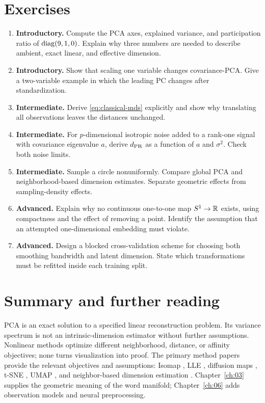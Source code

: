 \section{Exercises}
\begin{enumerate}
\item \textbf{Introductory.} Compute the PCA axes, explained variance, and participation ratio of $\operatorname{diag}(9,1,0)$. Explain why three numbers are needed to describe ambient, exact linear, and effective dimension.
\item \textbf{Introductory.} Show that scaling one variable changes covariance-PCA. Give a two-variable example in which the leading PC changes after standardization.
\item \textbf{Intermediate.} Derive \eqref{eq:classical-mds} explicitly and show why translating all observations leaves the distances unchanged.
\item \textbf{Intermediate.} For $p$-dimensional isotropic noise added to a rank-one signal with covariance eigenvalue $a$, derive $d_{\rm PR}$ as a function of $a$ and $\sigma^2$. Check both noise limits.
\item \textbf{Intermediate.} Sample a circle nonuniformly. Compare global PCA and neighborhood-based dimension estimates. Separate geometric effects from sampling-density effects.
\item \textbf{Advanced.} Explain why no continuous one-to-one map $S^1\to\mathbb{R}$ exists, using compactness and the effect of removing a point. Identify the assumption that an attempted one-dimensional embedding must violate.
\item \textbf{Advanced.} Design a blocked cross-validation scheme for choosing both smoothing bandwidth and latent dimension. State which transformations must be refitted inside each training split.
\end{enumerate}

\section{Summary and further reading}
PCA is an exact solution to a specified linear reconstruction problem. Its variance spectrum is not an intrinsic-dimension estimator without further assumptions. Nonlinear methods optimize different neighborhood, distance, or affinity objectives; none turns visualization into proof. The primary method papers provide the relevant objectives and assumptions: Isomap \citep{tenenbaum2000}, LLE \citep{roweis2000}, diffusion maps \citep{coifman2006}, t-SNE \citep{vandermaaten2008}, UMAP \citep{mcinnes2018}, and neighbor-based dimension estimation \citep{levina2004}. Chapter~\ref{ch:03} supplies the geometric meaning of the word manifold; Chapter~\ref{ch:06} adds observation models and neural preprocessing.
